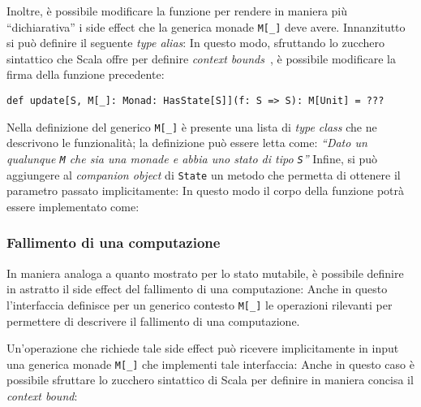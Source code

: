 Inoltre, è possibile modificare la funzione per rendere in maniera più ``dichiarativa'' i side effect che la generica monade \lstinline{M[_]} deve avere. Innanzitutto si può definire il seguente \emph{type alias}:
In questo modo, sfruttando lo zucchero sintattico che Scala offre per definire \emph{context bounds}~\cite{cit:context-bounds}, è possibile modificare la firma della funzione precedente:
\begin{lstlisting}[language=scala3]
def update[S, M[_]: Monad: HasState[S]](f: S => S): M[Unit] = ???
\end{lstlisting}
Nella definizione del generico \lstinline{M[_]} è presente una lista di \emph{type class} che ne descrivono le funzionalità; la definizione può essere letta come: \emph{``Dato un qualunque \lstinline{M} che sia una monade e abbia uno stato di tipo \lstinline{S}''}
Infine, si può aggiungere al \emph{companion object} di \lstinline{State} un metodo che permetta di ottenere il parametro passato implicitamente:
In questo modo il corpo della funzione potrà essere implementato come:

\subsubsection{Fallimento di una computazione}
In maniera analoga a quanto mostrato per lo stato mutabile, è possibile definire in astratto il side effect del fallimento di una computazione:
Anche in questo l'interfaccia definisce per un generico contesto \lstinline{M[_]} le operazioni rilevanti per permettere di descrivere il fallimento di una computazione.

Un'operazione che richiede tale side effect può ricevere implicitamente in input una generica monade \lstinline{M[_]} che implementi tale interfaccia:
Anche in questo caso è possibile sfruttare lo zucchero sintattico di Scala per definire in maniera concisa il \emph{context bound}:

